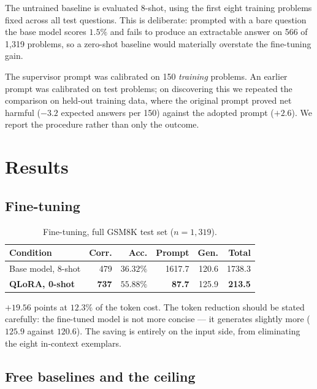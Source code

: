 \documentclass[conference]{IEEEtran}
\begin{document}
The untrained baseline is evaluated 8-shot, using the first eight training problems fixed
across all test questions. This is deliberate: prompted with a bare question the base model
scores $1.5\%$ and fails to produce an extractable answer on 566 of 1{,}319 problems, so a
zero-shot baseline would materially overstate the fine-tuning gain.

The supervisor prompt was calibrated on 150 \emph{training} problems. An earlier prompt was
calibrated on test problems; on discovering this we repeated the comparison on held-out
training data, where the original prompt proved net harmful ($-3.2$ expected answers per
150) against the adopted prompt ($+2.6$). We report the procedure rather than only the
outcome.

\section{Results}

\subsection{Fine-tuning}

\begin{table}[t]
\caption{Fine-tuning, full GSM8K test set ($n=1{,}319$).}
\label{tab:finetune}
\centering
\small
\begin{tabular}{@{}lrrrrr@{}}
\toprule
Condition & Corr. & Acc. & Prompt & Gen. & Total \\
\midrule
Base model, 8-shot & 479 & $36.32\%$ & 1617.7 & 120.6 & 1738.3 \\
\textbf{QLoRA, 0-shot} & \textbf{737} & $\mathbf{55.88\%}$ & \textbf{87.7} & 125.9 & \textbf{213.5} \\
\bottomrule
\end{tabular}
\end{table}

$+19.56$ points at $12.3\%$ of the token cost. The token reduction should be stated
carefully: the fine-tuned model is not more concise --- it generates slightly more
($125.9$ against $120.6$). The saving is entirely on the input side, from eliminating the
eight in-context exemplars.

\subsection{Free baselines and the ceiling}
\label{sec:free}
\end{document}
